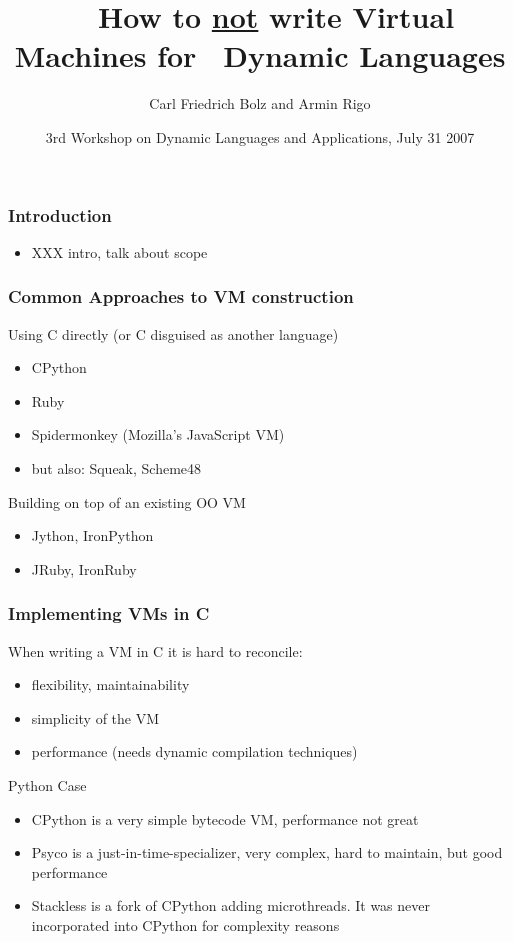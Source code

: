 \documentclass[utf8x]{beamer}
\title{~~How to \underline{not} write Virtual Machines for ~Dynamic Languages}
\author{Carl Friedrich Bolz and Armin Rigo}
\institute[Heinrich-Heine-Universität Düsseldorf]
{
  Institut für Informatik\\
  Heinrich-Heine-Universität Düsseldorf
}
\date{3rd Workshop on Dynamic Languages and Applications, July 31 2007}
\begin{document}
\begin{frame}
  \titlepage
\end{frame}


\begin{frame}
  \frametitle{Introduction}
  \begin{itemize}
  \item XXX intro, talk about scope
  \end{itemize}
\end{frame}


\begin{frame}
  \frametitle{Common Approaches to VM construction}
  \begin{block}{
    Using C directly (or C disguised as another language)}
    \begin{itemize}
    \item
      CPython
    \item
      Ruby
    \item
      Spidermonkey (Mozilla's JavaScript VM)
    \item
      but also: Squeak, Scheme48
    \end{itemize}
  \end{block}
  \begin{block}{
    Building on top of an existing OO VM}
    \begin{itemize}
    \item
      Jython, IronPython
    \item
      JRuby, IronRuby
    \end{itemize}
  \end{block}
\end{frame}

\begin{frame}
  \frametitle{Implementing VMs in C}
  When writing a VM in C it is hard to reconcile:
  \begin{itemize}
  \item
    flexibility, maintainability
  \item
    simplicity of the VM
  \item
    performance (needs dynamic compilation techniques)
  \end{itemize}
  \pause
  \begin{block}{
    Python Case}
    \begin{itemize}
    \item
      \alert{CPython} is a very simple bytecode VM, performance not great
    \item
      \alert{Psyco} is a just-in-time-specializer, very complex, hard to
      maintain, but good performance
    \item
      \alert{Stackless} is a fork of CPython adding microthreads. It was never
      incorporated into CPython for complexity reasons
    \end{itemize}
  \end{block}
\end{frame}
\end{document}
